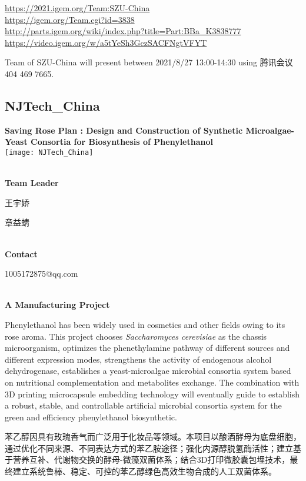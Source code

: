\url{https://2021.igem.org/Team:SZU-China }\\
\url{https://igem.org/Team.cgi?id=3838 }\\
\url{http://parts.igem.org/wiki/index.php?title=Part:BBa_K3838777 }\\
\url{https://video.igem.org/w/a5tYeSh3GczSACFNgtVFYT }\\

\vfill{}









Team of SZU-China will present between 2021/8/27 13:00-14:30        using 腾讯会议 404 469 7665.
\newpage


\subsection{\textcolor{Blu}{ NJTech\_China } }
\vspace{5mm}
\begin{center}
\large{
  \textbf{ Saving Rose Plan : Design and Construction of Synthetic Microalgae-Yeast Consortia for Biosynthesis of Phenylethanol }\\

  \texttt{[image: NJTech\_China]}
}
\end{center}
\textbf{\\Team Leader}

  王宇娇

  章益蜻


\textbf{\\Contact}

  1005172875@qq.com


\textbf{\\A Manufacturing Project\\}\begin{spacing}{1.5}

Phenylethanol has been widely used in cosmetics and other fields owing to its rose aroma. This project chooses \textit{Saccharomyces cerevisiae} as the chassis microorganism, optimizes the phenethylamine pathway of different sources and different expression modes, strengthens the activity of endogenous alcohol dehydrogenase, establishes a yeast-microalgae microbial consortia system based on nutritional complementation and metabolites exchange. The combination with 3D printing microcapsule embedding technology will eventually guide to establish a robust, stable, and controllable artificial microbial consortia system for the green and efficiency phenylethanol biosynthetic.

苯乙醇因具有玫瑰香气而广泛用于化妆品等领域。本项目以酿酒酵母为底盘细胞，通过优化不同来源、不同表达方式的苯乙胺途径；强化内源醇脱氢酶活性；建立基于营养互补、代谢物交换的酵母-微藻双菌体系；结合3D打印微胶囊包埋技术，最终建立系统鲁棒、稳定、可控的苯乙醇绿色高效生物合成的人工双菌体系。\end{spacing}
\\

